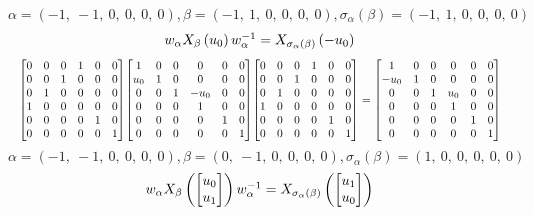 \documentclass[11pt]{article}
\theoremstyle{definition}
\begin{document}
\[
\alpha = \left( -1, \  -1, \  0, \  0, \  0, \  0\right), \beta = \left( -1, \  1, \  0, \  0, \  0, \  0\right), \sigma_{\alpha}(\beta) = \left( -1, \  1, \  0, \  0, \  0, \  0\right)
\]
\[
\scaletoalign{\textwidth}{w_{\alpha} X_{\beta}\left(u_{0}\right) w_{\alpha}^{-1} = X_{\sigma_{\alpha}\left(\beta\right)}\left(- u_{0}\right)}
\]
\[
\scaletoalign{\textwidth}{{\left[\begin{matrix}0 & 0 & 0 & 1 & 0 & 0\\0 & 0 & 1 & 0 & 0 & 0\\0 & 1 & 0 & 0 & 0 & 0\\1 & 0 & 0 & 0 & 0 & 0\\0 & 0 & 0 & 0 & 1 & 0\\0 & 0 & 0 & 0 & 0 & 1\end{matrix}\right]} {\left[\begin{matrix}1 & 0 & 0 & 0 & 0 & 0\\u_{0} & 1 & 0 & 0 & 0 & 0\\0 & 0 & 1 & - u_{0} & 0 & 0\\0 & 0 & 0 & 1 & 0 & 0\\0 & 0 & 0 & 0 & 1 & 0\\0 & 0 & 0 & 0 & 0 & 1\end{matrix}\right]} {\left[\begin{matrix}0 & 0 & 0 & 1 & 0 & 0\\0 & 0 & 1 & 0 & 0 & 0\\0 & 1 & 0 & 0 & 0 & 0\\1 & 0 & 0 & 0 & 0 & 0\\0 & 0 & 0 & 0 & 1 & 0\\0 & 0 & 0 & 0 & 0 & 1\end{matrix}\right]} = {\left[\begin{matrix}1 & 0 & 0 & 0 & 0 & 0\\- u_{0} & 1 & 0 & 0 & 0 & 0\\0 & 0 & 1 & u_{0} & 0 & 0\\0 & 0 & 0 & 1 & 0 & 0\\0 & 0 & 0 & 0 & 1 & 0\\0 & 0 & 0 & 0 & 0 & 1\end{matrix}\right]}}
\]
\[
\alpha = \left( -1, \  -1, \  0, \  0, \  0, \  0\right), \beta = \left( 0, \  -1, \  0, \  0, \  0, \  0\right), \sigma_{\alpha}(\beta) = \left( 1, \  0, \  0, \  0, \  0, \  0\right)
\]
\[
\scaletoalign{\textwidth}{w_{\alpha} X_{\beta}\left(\left[\begin{matrix}u_{0}\\u_{1}\end{matrix}\right]\right) w_{\alpha}^{-1} = X_{\sigma_{\alpha}\left(\beta\right)}\left(\left[\begin{matrix}u_{1}\\u_{0}\end{matrix}\right]\right)}
\]
\end{document}

